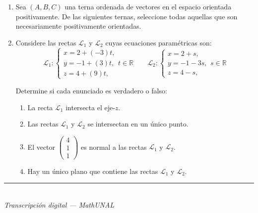 \documentclass[11pt]{article}
\newcommand{\vectiii}[3]{\begin{pmatrix}#1\\#2\\#3\end{pmatrix}}
\newcommand{\examfooter}{\vfill\rule{\linewidth}{0.4pt}\\[1pt]{\scriptsize\textit{Transcripción digital --- MathUNAL}\hfill\textcolor{unalblue}{\textbf{\thepage}}}}
\begin{document}
\begin{enumerate}
\begin{enumerate}[label=(\alph*)]
\item Suponga que la matriz de la transformación es $[T]=\begin{bmatrix}a&b\\c&d\end{bmatrix}$. Encuentre los valores de $a,b,c$ y $d$.
\item Los vértices del rombo $\mathcal{R}$ (café) de la figura (a), tienen coordenadas enteras. Encuentre el área de $T(\mathcal{R})$.
\item Considere las rectas
$$\mathcal{L}: -4x+7y+10=0,\qquad T(\mathcal{L}): y=mx+p,$$
donde $T(\mathcal{L})$ es la imagen de $\mathcal{L}$ bajo la transformación lineal $T$. Encuentre los coeficientes $m$ y $p$.
\end{enumerate}

\item Sea $(A,B,C)$ una terna ordenada de vectores en el espacio orientada positivamente. De las siguientes ternas, seleccione todas aquellas que son necesariamente positivamente orientadas.


\item Considere las rectas $\mathcal{L}_1$ y $\mathcal{L}_2$ cuyas ecuaciones paramétricas son:
$$\mathcal{L}_1:\begin{cases}x=2+(-3)t,\\ y=-1+(3)t,\\ z=4+(9)t,\end{cases} t\in\mathbb{R}\qquad \mathcal{L}_2:\begin{cases}x=2+s,\\ y=-1-3s,\\ z=4-s,\end{cases} s\in\mathbb{R}$$

Determine si cada enunciado es verdadero o falso:

\begin{enumerate}[label=(\alph*)]
\item La recta $\mathcal{L}_1$ intersecta el eje-$z$.
\item Las rectas $\mathcal{L}_1$ y $\mathcal{L}_2$ se intersectan en un único punto.
\item El vector $\vectiii{4}{1}{1}$ es normal a las rectas $\mathcal{L}_1$ y $\mathcal{L}_2$.
\item Hay un único plano que contiene las rectas $\mathcal{L}_1$ y $\mathcal{L}_2$.
\end{enumerate}

\end{enumerate}

\examfooter
\end{document}
